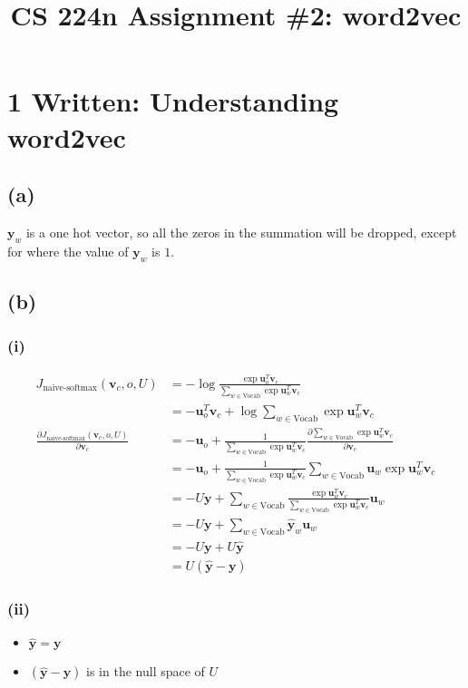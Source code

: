 \documentclass[12pt]{article}
\title{CS 224n Assignment \#2: word2vec}
\begin{document}
\section*{1 Written: Understanding word2vec}

\subsection*{(a)}
$\pmb{y}_w$ is a one hot vector, so all the zeros in the summation will be dropped, except for where the value of $\pmb{y}_w$ is $1$.

\subsection*{(b)}

\subsubsection*{(i)}
\begin{align*}
    J_{\text{naive-softmax}}(\pmb{v}_c, o, U) &= -\log{ \frac{\exp{\pmb{u}_o^T \pmb{v}_c}}{\sum_{w \in \text{Vocab}}{\exp{\pmb{u}_w^T \pmb{v}_c}}}}\\
    &= -\pmb{u}_o^T \pmb{v}_c + \log{\sum_{w \in \text{Vocab}}{\exp{\pmb{u}_w^T \pmb{v}_c}}}\\
    \frac{\partial J_{\text{naive-softmax}}(\pmb{v}_c, o, U)}{\partial \pmb{v}_c} &= -\pmb{u}_o + \frac{1}{\sum_{w \in \text{Vocab}}{\exp{\pmb{u}_w^T \pmb{v}_c}}} \frac{\partial \sum_{w \in \text{Vocab}}{\exp{\pmb{u}_w^T \pmb{v}_c}}}{\partial \pmb{v}_c}\\
    &= -\pmb{u}_o + \frac{1}{\sum_{w \in \text{Vocab}}{\exp{\pmb{u}_w^T \pmb{v}_c}}} \sum_{w \in \text{Vocab}}{\pmb{u}_w \exp{\pmb{u}_w^T \pmb{v}_c}}\\
    &= -U \pmb{y} + \sum_{w \in \text{Vocab}}{\frac{\exp{\pmb{u}_w^T \pmb{v}_c}}{\sum_{w \in \text{Vocab}}{\exp{\pmb{u}_w^T \pmb{v}_c}}} \pmb{u}_w}\\
    &= -U \pmb{y} + \sum_{w \in \text{Vocab}}{\hat{\pmb{y}}_w \pmb{u}_w}\\
    &= -U \pmb{y} + U \hat{\pmb{y}}\\
    &= U (\hat{\pmb{y}} - \pmb{y})
\end{align*}

\subsubsection*{(ii)}
\begin{itemize}
    \item $\hat{\pmb{y}} = \pmb{y}$
    \item $(\hat{\pmb{y}} - \pmb{y})$ is in the null space of $U$
\end{itemize}
\end{document}
